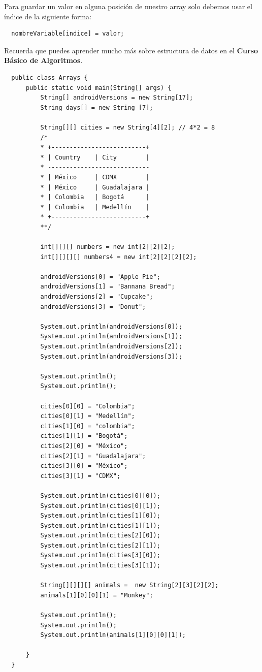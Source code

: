 \documentclass{article}
\begin{document}
Para guardar un valor en alguna posición de nuestro array solo debemos usar el
índice de la siguiente forma:

\begin{verbatim}
  nombreVariable[indice] = valor;
\end{verbatim}

Recuerda que puedes aprender mucho más sobre estructura de datos en el
\textbf{Curso Básico de Algoritmos}.

\begin{verbatim}
  public class Arrays {
      public static void main(String[] args) {
          String[] androidVersions = new String[17];
          String days[] = new String [7];

          String[][] cities = new String[4][2]; // 4*2 = 8
          /*
          * +--------------------------+
          * | Country    | City        |
          * ----------------------------
          * | México     | CDMX        |
          * | México     | Guadalajara |
          * | Colombia   | Bogotá      |
          * | Colombia   | Medellín    |
          * +--------------------------+
          **/

          int[][][] numbers = new int[2][2][2];
          int[][][][] numbers4 = new int[2][2][2][2];

          androidVersions[0] = "Apple Pie";
          androidVersions[1] = "Bannana Bread";
          androidVersions[2] = "Cupcake";
          androidVersions[3] = "Donut";

          System.out.println(androidVersions[0]);
          System.out.println(androidVersions[1]);
          System.out.println(androidVersions[2]);
          System.out.println(androidVersions[3]);

          System.out.println();
          System.out.println();

          cities[0][0] = "Colombia";
          cities[0][1] = "Medellín";
          cities[1][0] = "colombia";
          cities[1][1] = "Bogotá";
          cities[2][0] = "México";
          cities[2][1] = "Guadalajara";
          cities[3][0] = "México";
          cities[3][1] = "CDMX";

          System.out.println(cities[0][0]);
          System.out.println(cities[0][1]);
          System.out.println(cities[1][0]);
          System.out.println(cities[1][1]);
          System.out.println(cities[2][0]);
          System.out.println(cities[2][1]);
          System.out.println(cities[3][0]);
          System.out.println(cities[3][1]);

          String[][][][] animals =  new String[2][3][2][2];
          animals[1][0][0][1] = "Monkey";

          System.out.println();
          System.out.println();
          System.out.println(animals[1][0][0][1]);

      }
  }
\end{verbatim}
\end{document}
